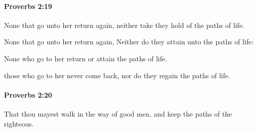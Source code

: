 		\paragraph{Proverbs 2:19} %
			\label{PROVERBS-2-19}

			None that go unto her return again, neither take they hold of the paths of life.

			\begin{versebox}
					\item[BHS] 
					\item[ASV] None that go unto her return again, Neither do they attain unto the paths of life:
					\item[NIV] None who go to her return or attain the paths of life.
					\item[NRSV] those who go to her never come back, nor do they regain the paths of life.
			\end{versebox}

		\paragraph{Proverbs 2:20} %
			\label{PROVERBS-2-20}

			That thou mayest walk in the way of good men, and keep the paths of the righteous.

